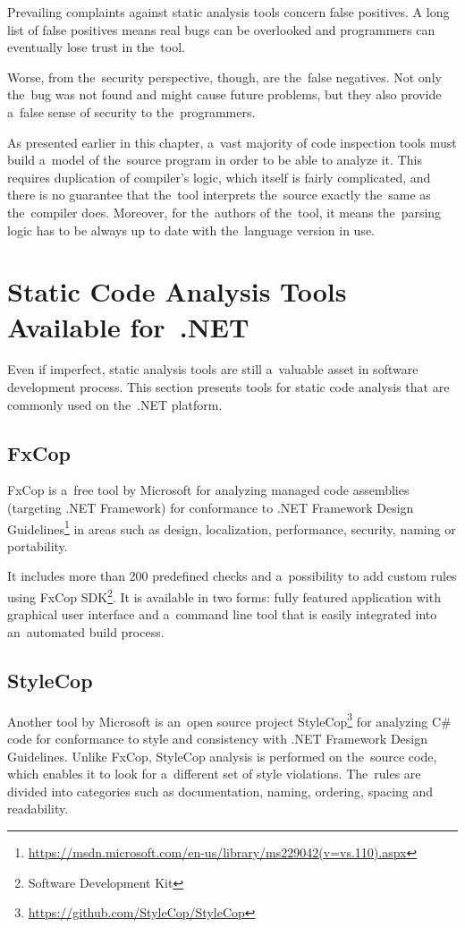 \documentclass[
  digital, %
  table,   %
  lof,     %
  lot,     %
  oneside,
]{fithesis3}
\begin{document}
Prevailing complaints against static analysis tools concern false positives. A long list of false positives means real bugs can be overlooked and programmers can eventually lose trust in the~tool.

Worse, from the~security perspective, though, are the~false negatives. Not only the~bug was not found and might cause future problems, but they also provide a~false sense of security to the~programmers. 

As presented earlier in this chapter, a~vast majority of code inspection tools must build a~model of the~source program in order to be able to analyze it. This requires duplication of compiler's logic, which itself is fairly complicated, and there is no guarantee that the~tool interprets the~source exactly the~same as the~compiler does. Moreover, for the~authors of the~tool, it means the~parsing logic has to be always up to date with the~language version in use. 

\section{Static Code Analysis Tools Available for~.NET}
Even if imperfect, static analysis tools are still a~valuable asset in software development process. This section presents tools for static code analysis that are commonly used on the~.NET platform.

\subsection{FxCop}
FxCop is a~free tool by Microsoft for analyzing managed code assemblies (targeting .NET Framework) for conformance to .NET Framework Design Guidelines\footnote{\url{https://msdn.microsoft.com/en-us/library/ms229042(v=vs.110).aspx}} in areas such as design, localization, performance, security, naming or portability. 

It includes more than 200 predefined checks and a~possibility to add custom rules using FxCop SDK\footnote{Software Development Kit}. It is available in two forms: fully featured application with graphical user interface and a~command line tool that is easily integrated into an~automated build process. 

\subsection{StyleCop}
Another tool by Microsoft is an~open source project StyleCop\footnote{\url{https://github.com/StyleCop/StyleCop}} for analyzing C\# code for conformance to style and consistency with .NET Framework Design Guidelines. Unlike FxCop, StyleCop analysis is performed on the~source code, which enables it to look for a~different set of style violations. The~rules are divided into categories such as documentation, naming, ordering, spacing and readability. 
\end{document}
